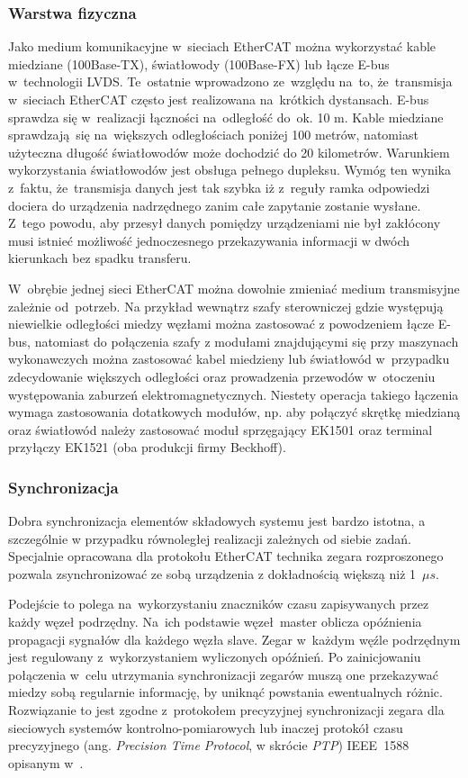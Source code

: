 \subsubsection{Warstwa fizyczna}
Jako medium komunikacyjne w~sieciach EtherCAT można wykorzystać kable miedziane (100Base-TX), światłowody (100Base-FX) lub łącze E-bus w~technologii LVDS. Te~ostatnie wprowadzono ze~względu na~to, że~transmisja w~sieciach EtherCAT często jest realizowana na~krótkich dystansach. E-bus sprawdza się w~realizacji łączności na~odległość do~ok. 10 m. Kable miedziane sprawdzają~się na~większych odległościach poniżej 100 metrów, natomiast użyteczna długość światłowodów może dochodzić do 20 kilometrów. Warunkiem wykorzystania światłowodów jest obsługa pełnego dupleksu. Wymóg ten wynika z~faktu, że~transmisja danych jest tak szybka iż z~reguły ramka odpowiedzi dociera do urządzenia nadrzędnego zanim całe zapytanie zostanie wysłane. Z~tego powodu, aby przesył danych pomiędzy urządzeniami nie był zakłócony musi istnieć możliwość jednoczesnego przekazywania informacji w dwóch kierunkach bez spadku transferu.

W~obrębie jednej sieci EtherCAT można dowolnie zmieniać medium transmisyjne zależnie od~potrzeb. Na przykład wewnątrz szafy sterowniczej gdzie występują niewielkie odległości miedzy węzłami można zastosować z powodzeniem łącze E-bus, natomiast do połączenia szafy z modułami znajdującymi się przy maszynach wykonawczych można zastosować kabel miedzieny lub światłowód w~przypadku zdecydowanie większych odległości oraz prowadzenia przewodów w~otoczeniu występowania zaburzeń elektromagnetycznych. Niestety operacja takiego łączenia wymaga zastosowania dotatkowych modułów, np. aby połączyć skrętkę miedzianą oraz światłowód należy zastosować moduł sprzęgający EK1501 oraz terminal przyłączy EK1521 (oba produkcji firmy Beckhoff).

\subsubsection{Synchronizacja}
Dobra synchronizacja elementów składowych systemu jest bardzo istotna, a szczególnie w przypadku równoległej realizacji zależnych od siebie zadań. Specjalnie opracowana dla protokołu EtherCAT technika zegara rozproszonego pozwala zsynchronizować ze sobą urządzenia z dokładnością większą niż 1~$\mu s$. 

Podejście to polega na~wykorzystaniu znaczników czasu zapisywanych przez każdy węzeł podrzędny. Na~ich podstawie węzeł~master oblicza opóźnienia propagacji sygnałów dla każdego węzła slave. Zegar w~każdym węźle podrzędnym jest regulowany z~wykorzystaniem wyliczonych opóźnień. Po zainicjowaniu połączenia w~celu utrzymania synchronizacji zegarów muszą one przekazywać miedzy sobą regularnie informację, by uniknąć powstania ewentualnych różnic. Rozwiązanie to jest zgodne z~protokołem precyzyjnej synchronizacji zegara dla sieciowych systemów kontrolno-pomiarowych lub inaczej protokół czasu precyzyjnego (ang. \textit{Precision Time Protocol}, w skrócie \textit{PTP}) IEEE~1588 opisanym w~\cite{ieee}.


